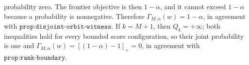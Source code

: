 probability zero. The frontier objective is then \(1-\alpha\), and it cannot exceed \(1-\alpha\) because a probability is nonnegative. Therefore \(\Gamma_{M,\alpha}(w)=1-\alpha\), in agreement with \(\texttt{prop:disjoint-orbit-witness}\). If \(k=M+1\), then \(Q_k=+\infty\); both inequalities hold for every bounded score configuration, so their joint probability is one and \(\Gamma_{M,\alpha}(w)=[(1-\alpha)-1]_+=0\), in agreement with \(\texttt{prop:rank-boundary}\).